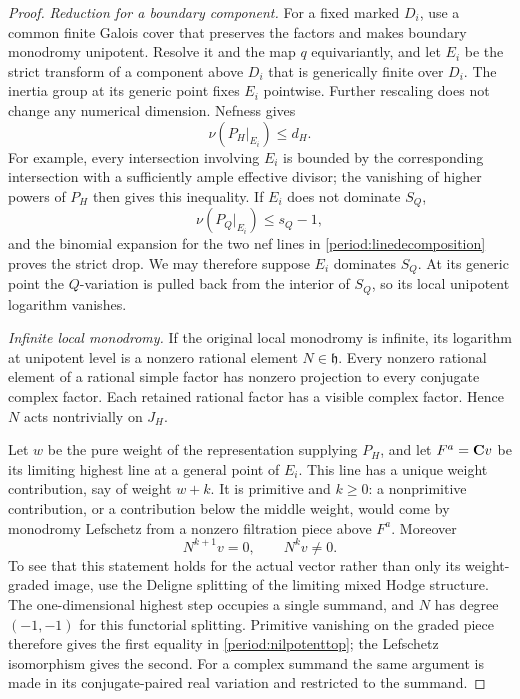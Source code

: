 \begin{proof}
\smallskip\noindent
\emph{Reduction for a boundary component.}
For a fixed marked $D_i$, use a common finite Galois cover that
preserves the factors and makes boundary monodromy unipotent.
Resolve it and the map $q$ equivariantly, and let $E_i$ be the
strict transform of a component above $D_i$ that is generically
finite over $D_i$.  The inertia group at its generic point fixes
$E_i$ pointwise.  Further rescaling does not change any numerical
dimension.  Nefness gives
\[
                     \nu(P_H|_{E_i})\leq d_H.
\]
For example, every intersection involving $E_i$ is bounded by
the corresponding intersection with a sufficiently ample
effective divisor; the vanishing of higher powers of $P_H$
then gives this inequality.  If $E_i$ does not dominate $S_Q$,
\[
                     \nu(P_Q|_{E_i})\leq s_Q-1,
\]
and the binomial expansion for the two nef lines in
\eqref{period:linedecomposition} proves the strict drop.
We may therefore suppose $E_i$ dominates $S_Q$.  At its generic
point the $Q$-variation is pulled back from the interior of
$S_Q$, so its local unipotent logarithm vanishes.

\smallskip\noindent
\emph{Infinite local monodromy.}
If the original local monodromy is infinite, its logarithm at
unipotent level is a nonzero rational element
$N\in\mathfrak h$.  Every nonzero rational element of a rational
simple factor has nonzero projection to every conjugate complex
factor.  Each retained rational factor has a visible complex
factor.  Hence $N$ acts nontrivially on $J_H$.

Let $w$ be the pure weight of the representation supplying $P_H$,
and let $F^a=\mathbf C v$ be its limiting highest line at a general
point of $E_i$.  This line has a unique weight contribution,
say of weight $w+k$.  It is primitive and $k\geq0$: a
nonprimitive contribution, or a contribution below the middle
weight, would come by monodromy Lefschetz from a nonzero
filtration piece above $F^a$.
Moreover
\begin{equation}
\label{period:nilpotenttop}
                    N^{k+1}v=0,\qquad N^kv\ne0.
\end{equation}
To see that this statement holds for the actual vector rather
than only its weight-graded image, use the Deligne splitting
of the limiting mixed Hodge structure.  The one-dimensional
highest step occupies a single summand, and $N$ has degree
$(-1,-1)$ for this functorial splitting.  Primitive vanishing
on the graded piece therefore gives the first equality in
\eqref{period:nilpotenttop}; the Lefschetz isomorphism gives
the second.  For a complex summand the same argument is made
in its conjugate-paired real variation and restricted to the
summand.


\end{proof}
